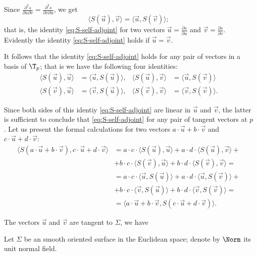 Since $\tfrac{\partial^2 s}{\partial u\partial v}=\tfrac{\partial^2 s}{\partial v\partial u}$, we get
\[\langle S({\vec u}),\vec v\rangle=\langle {\vec u},S(\vec v)\rangle;\]
that is, the identity \ref{eq:S-self-adjoint} for two vectors $\vec u=\tfrac{\partial s}{\partial u}$ and $\vec v=\tfrac{\partial s}{\partial v}$.
Evidently the identity \ref{eq:S-self-adjoint} holds if $\vec u=\vec v$.

It follows that the identity \ref{eq:S-self-adjoint} holds for any pair of vectors in a basis of $\T_p$; that is we have the following four identities:
\begin{align*}
 \langle S({\vec u}),\vec u\rangle&=\langle {\vec u},S(\vec u)\rangle,
 &\langle S({\vec u}),\vec v\rangle&=\langle {\vec u},S(\vec v)\rangle
 \\
 \langle S({\vec v}),\vec u\rangle&=\langle {\vec v},S(\vec u)\rangle,
 &\langle S({\vec v}),\vec v\rangle&=\langle {\vec v},S(\vec v)\rangle.
\end{align*}

Since both sides of this identiy \ref{eq:S-self-adjoint} are linear in $\vec u$ and $\vec v$,
the latter is sufficient to conclude that \ref{eq:S-self-adjoint} for any pair of tangent vectors at $p$.
Let us present the formal calculations for two vectors $a\cdot \vec u+b\cdot\vec v$ and $c\cdot \vec u+d\cdot\vec v$:
\begin{align*} 
\langle S(a\cdot \vec u+b\cdot\vec v),c\cdot \vec u+d\cdot\vec v\rangle
&=a\cdot c\cdot\langle S({\vec u}),\vec u\rangle + a\cdot d\cdot \langle S({\vec u}),\vec v\rangle+
\\
&+b\cdot c\cdot\langle S({\vec v}),\vec u\rangle + b\cdot d\cdot \langle S({\vec v}),\vec v\rangle=
\\
&=a\cdot c\cdot\langle {\vec u},S(\vec u)\rangle + a\cdot d\cdot \langle {\vec u},S(\vec v)\rangle+
\\
&+b\cdot c\cdot\langle {\vec v},S(\vec u)\rangle + b\cdot d\cdot \langle {\vec v},S(\vec v)\rangle=
\\
&=\langle a\cdot \vec u+b\cdot\vec v,S(c\cdot \vec u+d\cdot\vec v)\rangle.
\end{align*}

The vectors $\vec u$ and $\vec v$ are tangent to $\Sigma$, we have



\qeds



Let $\Sigma$ be an smooth oriented surface in the Euclidean space;
denote by $\Norm$ its unit normal field.

